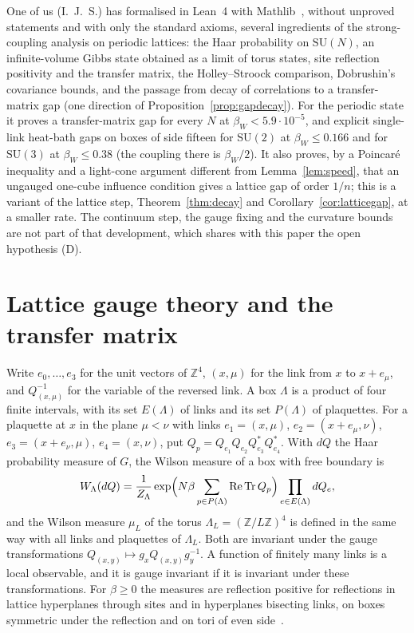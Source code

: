 \documentclass[11pt]{amsart}
\theoremstyle{definition}
\theoremstyle{remark}
\numberwithin{equation}{section}
\newcommand{\Z}{\mathbb{Z}}
\newcommand{\SU}{\mathrm{SU}}
\newcommand{\ReTr}{\operatorname{Re}\operatorname{Tr}}
\begin{document}
One of us (I.~J.~S.) has formalised in Lean~4 with Mathlib~\cite{Ses26}, without
unproved statements and with only the standard axioms, several ingredients of
the strong-coupling analysis on periodic lattices: the Haar probability on
$\SU(N)$, an infinite-volume Gibbs state obtained as a limit of torus states,
site reflection positivity and the transfer matrix, the Holley--Stroock
comparison, Dobrushin's covariance bounds, and the passage from decay of
correlations to a transfer-matrix gap (one direction of
Proposition~\ref{prop:gapdecay}). For the periodic state it proves a
transfer-matrix gap for every $N$ at $\beta_W<5.9\cdot10^{-5}$, and explicit
single-link heat-bath gaps on boxes of side fifteen for $\SU(2)$ at
$\beta_W\le0.166$ and for $\SU(3)$ at $\beta_W\le0.38$ (the coupling there is
$\beta_W/2$). It also proves, by a Poincar\'e inequality and a light-cone
argument different from Lemma~\ref{lem:speed}, that an ungauged one-cube
influence condition gives a lattice gap of order $1/n$; this is a variant of
the lattice step, Theorem~\ref{thm:decay} and Corollary~\ref{cor:latticegap},
at a smaller rate. The continuum step, the gauge
fixing and the curvature bounds are not part of that development, which shares
with this paper the open hypothesis (D).

\section{Lattice gauge theory and the transfer matrix}\label{sec:lattice}

Write $e_0,\dots,e_3$ for the unit vectors of $\Z^4$, $(x,\mu)$ for the link
from $x$ to $x+e_\mu$, and $Q_{(x,\mu)}^{-1}$ for the variable of the reversed
link. A box $\Lambda$ is a product of four finite intervals, with its set
$E(\Lambda)$ of links and its set $P(\Lambda)$ of plaquettes. For a plaquette
at $x$ in the plane $\mu<\nu$ with links $e_1=(x,\mu)$, $e_2=(x+e_\mu,\nu)$,
$e_3=(x+e_\nu,\mu)$, $e_4=(x,\nu)$, put $Q_p=Q_{e_1}Q_{e_2}Q_{e_3}^*Q_{e_4}^*$.
With $dQ$ the Haar probability measure of $G$, the Wilson measure of a box
with free boundary is
\[
W_\Lambda(dQ)=\frac1{Z_\Lambda}\exp\Bigl(N\beta\sum_{p\in P(\Lambda)}\ReTr
Q_p\Bigr)\prod_{e\in E(\Lambda)}dQ_e ,
\]
and the Wilson measure $\mu_L$ of the torus $\Lambda_L=(\Z/L\Z)^4$ is defined
in the same way with all links and plaquettes of $\Lambda_L$. Both are
invariant under the gauge transformations $Q_{(x,y)}\mapsto g_xQ_{(x,y)}
g_y^{-1}$. A function of finitely many links is a local observable, and it
is gauge invariant if it is invariant under these transformations. For
$\beta\ge0$ the measures are reflection positive for reflections in lattice
hyperplanes through sites and in hyperplanes bisecting links, on boxes
symmetric under the reflection and on tori of even side~\cite{OSei78}.
\end{document}
